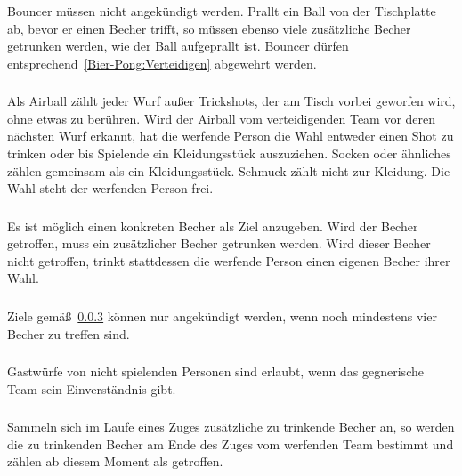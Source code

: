 \subsubsection{}
\glqq{} Bouncer\grqq{} müssen nicht angekündigt werden.
Prallt ein Ball von der Tischplatte ab, bevor er einen Becher trifft, so müssen ebenso viele zusätzliche Becher getrunken werden, wie der Ball aufgeprallt ist.
Bouncer dürfen entsprechend~\ref{Bier-Pong:Verteidigen} abgewehrt werden.

\subsubsection{}
Als \glqq{} Airball\grqq{} zählt jeder Wurf außer Trickshots, der am Tisch vorbei geworfen wird, ohne etwas zu berühren.
Wird der Airball vom verteidigenden Team vor deren nächsten Wurf erkannt, hat die werfende Person die Wahl entweder einen Shot zu trinken oder bis Spielende ein Kleidungsstück auszuziehen.
Socken oder ähnliches zählen gemeinsam als ein Kleidungsstück.
Schmuck zählt nicht zur Kleidung.
Die Wahl steht der werfenden Person frei.

\subsubsection{}\label{Bier-Pong:Werfen:Ankündigen}
Es ist möglich einen konkreten Becher als Ziel anzugeben.
Wird der Becher getroffen, muss ein zusätzlicher Becher getrunken werden.
Wird dieser Becher nicht getroffen, trinkt stattdessen die werfende Person einen eigenen Becher ihrer Wahl.

\subsubsection{}
Ziele gemäß~\ref{Bier-Pong:Werfen:Ankündigen} können nur angekündigt werden, wenn noch mindestens vier Becher zu treffen sind.

\subsubsection{}
Gastwürfe von nicht spielenden Personen sind erlaubt, wenn das gegnerische Team sein Einverständnis gibt.

\subsubsection{}
Sammeln sich im Laufe eines Zuges zusätzliche zu trinkende Becher an, so werden die zu trinkenden Becher am Ende des Zuges vom werfenden Team bestimmt und zählen ab diesem Moment als getroffen.

